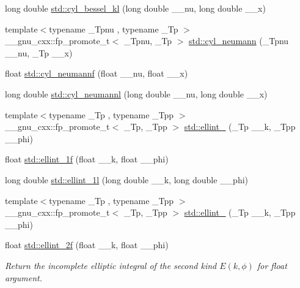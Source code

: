 \begin{DoxyCompactItemize}
\item 
long double \hyperlink{group__mathsf__std_gac35194b926270d7857d651e06198c7d3}{std\+::cyl\+\_\+bessel\+\_\+kl} (long double \+\_\+\+\_\+nu, long double \+\_\+\+\_\+x)
\item 
{\footnotesize template$<$typename \+\_\+\+Tpnu , typename \+\_\+\+Tp $>$ }\\\+\_\+\+\_\+gnu\+\_\+cxx\+::fp\+\_\+promote\+\_\+t$<$ \+\_\+\+Tpnu, \+\_\+\+Tp $>$ \hyperlink{group__mathsf__std_ga1e4bef23704469b0704cf15c5f04e29e}{std\+::cyl\+\_\+neumann} (\+\_\+\+Tpnu \+\_\+\+\_\+nu, \+\_\+\+Tp \+\_\+\+\_\+x)
\item 
float \hyperlink{group__mathsf__std_ga604c13e8f2bb7cd3c7c91d8b19d6b13a}{std\+::cyl\+\_\+neumannf} (float \+\_\+\+\_\+nu, float \+\_\+\+\_\+x)
\item 
long double \hyperlink{group__mathsf__std_gaf8986bae9a523c48d861d233835bda8f}{std\+::cyl\+\_\+neumannl} (long double \+\_\+\+\_\+nu, long double \+\_\+\+\_\+x)
\item 
{\footnotesize template$<$typename \+\_\+\+Tp , typename \+\_\+\+Tpp $>$ }\\\+\_\+\+\_\+gnu\+\_\+cxx\+::fp\+\_\+promote\+\_\+t$<$ \+\_\+\+Tp, \+\_\+\+Tpp $>$ \hyperlink{group__mathsf__std_ga1550d6947bbbeee9865aabd398102a36}{std\+::ellint\+\_} (\+\_\+\+Tp \+\_\+\+\_\+k, \+\_\+\+Tpp \+\_\+\+\_\+phi)
\item 
float \hyperlink{group__mathsf__std_ga308d23d70f4b5e848eb7a4173628ef3b}{std\+::ellint\+\_\+1f} (float \+\_\+\+\_\+k, float \+\_\+\+\_\+phi)
\item 
long double \hyperlink{group__mathsf__std_ga795383fa51e02351000b410b478d824f}{std\+::ellint\+\_\+1l} (long double \+\_\+\+\_\+k, long double \+\_\+\+\_\+phi)
\item 
{\footnotesize template$<$typename \+\_\+\+Tp , typename \+\_\+\+Tpp $>$ }\\\+\_\+\+\_\+gnu\+\_\+cxx\+::fp\+\_\+promote\+\_\+t$<$ \+\_\+\+Tp, \+\_\+\+Tpp $>$ \hyperlink{group__mathsf__std_gad64cb9babb7837d585912b1a94b2cb7d}{std\+::ellint\+\_} (\+\_\+\+Tp \+\_\+\+\_\+k, \+\_\+\+Tpp \+\_\+\+\_\+phi)
\item 
float \hyperlink{group__mathsf__std_ga594a730163c6228c75b152462700062b}{std\+::ellint\+\_\+2f} (float \+\_\+\+\_\+k, float \+\_\+\+\_\+phi)
\begin{DoxyCompactList}\small\item\em Return the incomplete elliptic integral of the second kind $ E(k,\phi) $ for {\ttfamily float} argument. \end{DoxyCompactList}\item 

\end{DoxyCompactItemize}
